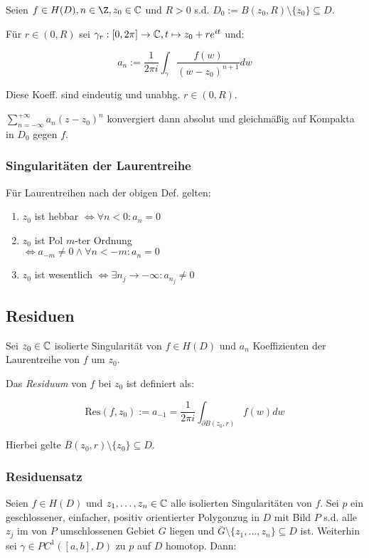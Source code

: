 Seien $f \in H(D), n \in \Z, z_0 \in \C$ und $R > 0$ s.d. $D_0 := B(z_0,R) \setminus \{z_0\} \subseteq D$.

Für $r \in (0,R)$ sei $\gamma_r : [0,2\pi] \to \mathbb{C}, t \mapsto z_0 + re^{it}$ und:

$$a_n := \frac{1}{2\pi i} \int_\gamma \frac{f(w)}{(w-z_0)^{n+1}} dw$$

Diese Koeff. sind eindeutig und unabhg. $r \in (0,R)$.

\spacing

$\sum_{n=-\infty}^{+\infty} a_n(z-z_0)^n$ konvergiert dann absolut und gleichmäßig auf Kompakta in $D_0$ gegen $f$.

\subsubsection*{Singularitäten der Laurentreihe}

Für Laurentreihen nach der obigen Def. gelten:

\begin{enumerate}[label=(\alph*)]
	\item $z_0$ ist hebbar $\iff \forall n < 0 : a_n = 0$
	\item $z_0$ ist Pol $m$-ter Ordnung \\ $\iff a_{-m} \neq 0 \land \forall n < -m : a_n = 0$
	\item $z_0$ ist wesentlich $\iff \exists n_j \to -\infty : a_{n_j} \neq 0$
\end{enumerate}

\subsection*{Residuen}

Sei $z_0 \in \mathbb{C}$ isolierte Singularität von $f \in H(D)$ und $a_n$ Koeffizienten der Laurentreihe von $f$ um $z_0$.

Das \emph{Residuum} von $f$ bei $z_0$ ist definiert als:

$$\text{Res}(f,z_0) := a_{-1} = \frac{1}{2\pi i} \int_{\partial B(z_0,r)} f(w) dw$$

Hierbei gelte $\overline B(z_0,r) \setminus \{z_0\} \subseteq D$.

\subsubsection*{Residuensatz}

Seien $f \in H(D)$ und $z_1, \dots, z_n \in \mathbb{C}$ alle isolierten Singularitäten von $f$. Sei $p$ ein geschlossener, einfacher, positiv orientierter Polygonzug in $D$ mit Bild $P$ s.d. alle $z_j$ im von $P$ umschlossenen Gebiet $G$ liegen und $\overline G \setminus \{z_1,\dots,z_n\} \subseteq D$ ist. Weiterhin sei $\gamma \in PC^1([a,b],D)$ zu $p$ auf $D$ homotop. Dann:


